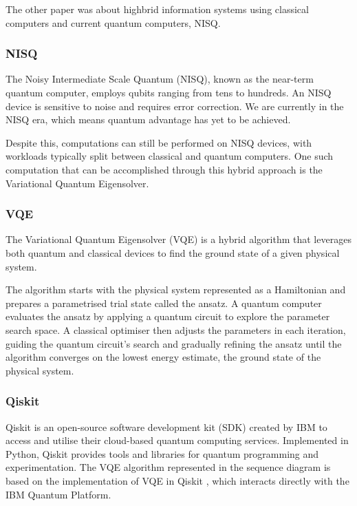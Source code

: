 \documentclass{article}
\begin{document}
{The other paper was about highbrid information systems using classical computers and current quantum computers, NISQ. 

\subsubsection{NISQ}

The Noisy Intermediate Scale Quantum (NISQ), known as the near-term quantum computer, employs qubits ranging from tens to hundreds. An NISQ device is sensitive to noise and requires error correction. We are currently in the NISQ era, which means quantum advantage has yet to be achieved.

Despite this, computations can still be performed on NISQ devices, with workloads typically split between classical and quantum computers. One such computation that can be accomplished through this hybrid approach is the Variational Quantum Eigensolver. 

\subsubsection{VQE}

The Variational Quantum Eigensolver (VQE) is a hybrid algorithm that leverages both quantum and classical devices to find the ground state of a given physical system. 

The algorithm starts with the physical system represented as a Hamiltonian and prepares a parametrised trial state called the ansatz. A quantum computer evaluates the ansatz by applying a quantum circuit to explore the parameter search space. A classical optimiser then adjusts the parameters in each iteration, guiding the quantum circuit’s search and gradually refining the ansatz until the algorithm converges on the lowest energy estimate, the ground state of the physical system.

\subsubsection{Qiskit}

Qiskit is an open-source software development kit (SDK) created by IBM to access and utilise their cloud-based quantum computing services. Implemented in Python, Qiskit provides tools and libraries for quantum programming and experimentation. The VQE algorithm represented in the sequence diagram is based on the implementation of VQE in Qiskit \cite{IBM2024}, which interacts directly with the IBM Quantum Platform.

}
\end{document}
